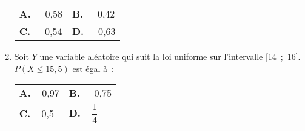 \begin{enumerate}
\begin{tabularx}{\linewidth}{*{2}{X}}
          \textbf{A.~~} 0,58&\textbf{B.~~} 0,42\\
          \textbf{C.~~} 0,54&\textbf{D.~~} 0,63
     \end{tabularx}
     \par
     \item  Soit $Y$ une variable aléatoire qui suit la loi uniforme sur l'intervalle [14~;~16].
     $P(X \leqslant 15,5)$ est égal à~:
     \par
     \begin{tabularx}{\linewidth}{*{2}{X}}%
          \textbf{A.~~}0,97 &\textbf{B.~~} 0,75\\
          \textbf{C.~~}0,5&\textbf{D.~~}$\dfrac{1}{4}$
     \end{tabularx}
     \par
\end{enumerate}

